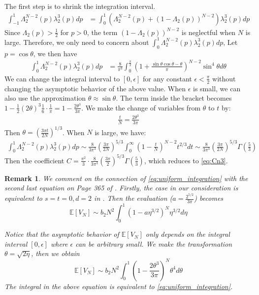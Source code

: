 \documentclass{article}
\newtheorem{remark}{Remark}
\def\E{\mathbb{E}}
\begin{document}
The first step is to shrink the integration interval.
\begin{align*}
    \int_{-1}^{1} \Lambda_2^{N-2}(p)\lambda_2^3(p)dp
    &=\int_{0}^{1} \left(\Lambda_2^{N-2}(p)
    +(1-\Lambda_2(p))^{N-2}\right)\lambda_2^3(p)dp
\end{align*}
Since $\Lambda_2(p) > \frac{1}{2}$ for $p>0$, the term
$(1-\Lambda_2(p))^{N-2}$ is neglectful when
$N$ is large.
Therefore, we only need to concern about
$\int_{0}^{1} \Lambda_2^{N-2}(p)\lambda_2^3(p)dp$,
Let $p=\cos\theta$, we then have
\begin{align}\label{eq:uniform_integration}
    \int_{0}^{1} \Lambda_2^{N-2}(p)\lambda_2^3(p)dp
    &=\frac{8}{\pi^3}\int_{0}^{\frac{\pi}{2}}
    \left(1+\frac{\sin\theta\cos\theta - \theta}{\pi}\right)^{N-2}
    \sin^4 \theta d\theta
\end{align}
We can change the integral interval to $[0, \epsilon]$
for any constant $\epsilon<\frac{\pi}{2}$ without changing
the asymptotic behavior of the above value.
When $\epsilon$ is small, we can also use the approximation
$\theta \approx \sin\theta$. The term inside
the bracket becomes $1-\frac{1}{2}(2\theta)^3\frac{1}{6}\cdot \frac{1}{\pi}
=1-\frac{2\theta^3}{3\pi}$. We make the change
of variables from $\theta$ to $t$ by:
\begin{align*}
    \frac{t}{N} = \frac{2\theta^3}{3\pi}
\end{align*}
Then $\theta = \left(\frac{3\pi t}{2N}\right)^{1/3}$.
When $N$ is large, we have:
\begin{align*}
\int_{0}^{1} \Lambda_2^{N-2}(p)\lambda_2^3(p)dp
\sim \frac{8}{3\pi^3} \left(\frac{3\pi}{2N}\right)^{5/3}\int_0^{\infty}
\left(1-\frac{t}{N}\right)^{N-2}t^{2/3}dt
\sim\frac{8}{3\pi^3} \left(\frac{3\pi}{2N}\right)^{5/3}
\Gamma\left(\frac{5}{3}\right)
\end{align*}
Then the coefficient $C=\frac{\pi^2}{3}\cdot\frac{8}{3\pi^3} \left(\frac{3\pi}{2}\right)^{5/3}
\Gamma\left(\frac{5}{3}\right)$,
which reduces to \eqref{eq:Cn3}.
\begin{remark}
    We comment on the connection of
    \eqref{eq:uniform_integration} with
    the second last equation on Page 365
    of \cite{affentranger1991convex}.
    Firstly, the case in our consideration is equivalent
    to $s=t=0, d=2$ in \cite{affentranger1991convex}.
    Then the evaluation ($ a=\frac{2^{5/2}}{3\pi}$)
    becomes
    \begin{equation}\label{eq:E_VN_qzero}
        \E[V_N] \sim b_2 N^2 \int_0^1 (1-a \eta^{3/2})^N \eta^{3/2} d\eta         
    \end{equation}

    Notice that the asymptotic behavior of $\E[V_N]$
    only depends on the integral interval $[0, \epsilon]$
    where $\epsilon$ can be arbitrary small.
    We make the transformation $\theta=\sqrt{2\eta}$,
    then we obtain
    $$
    \E[V_N] \sim b_2 N^2 \int_0^1 (1-\frac{2\theta^3}{3\pi})^N
    \theta^4d\theta
    $$
    The integral in the above equation
    is equivalent to \eqref{eq:uniform_integration}.
\end{remark}
\end{document}
